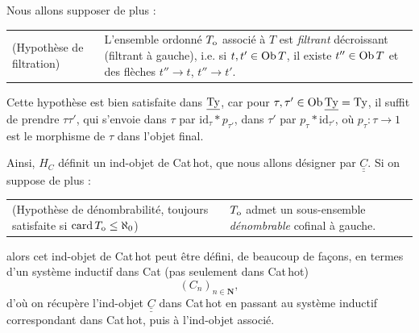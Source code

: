 Nous allons supposer de plus :

\noindent\begin{tabular}{@{}p{}p{}@{}}
(Hypothèse de filtration) & L'ensemble ordonné $T_{\mathrm{o}}$ associé à $T$ est \textit{filtrant} décroissant (filtrant à gauche), i.e. si $t,t' \in \mathrm{Ob}\, T$, il existe $t'' \in \mathrm{Ob}\, T$ et des flèches $t'' \longrightarrow t$, $t'' \longrightarrow t'$.
\end{tabular}

Cette hypothèse est bien satisfaite dans $\underline{\mathrm{Ty}}$, car pour $\tau,\tau' \in \mathrm{Ob}\, \underline{\mathrm{Ty}} = \mathrm{Ty}$, il suffit de prendre $\tau\tau'$, qui s'envoie dans $\tau$ par $\mathrm{id}_{\tau} * p_{\tau'}$, dans $\tau'$ par $p_{\tau} * \mathrm{id}_{\tau'}$, où $p_{\tau} : \tau \longrightarrow 1$ est le morphisme de $\tau$ dans l'objet final.

Ainsi, $H_{C}$ définit un ind-objet de Cat\,hot, que nous allons désigner par $\underline{\underline{C}}$. Si on suppose de plus :

\noindent\begin{tabular}{@{}p{}p{}@{}}
(Hypothèse de dénombrabilité, toujours satisfaite si $\mathrm{card}\,T_{\mathrm{o}} \leq \aleph_{0}$) & $T_{\mathrm{o}}$ admet un sous-ensemble \textit{dénombrable} cofinal à gauche.
\end{tabular}

alors cet ind-objet de Cat\,hot peut être défini, de beaucoup de façons, en termes
d'un système inductif dans Cat (pas seulement dans Cat\,hot)
\[
(C_{n})_{n\in\mathbf{N}},
\]
d'où on récupère l'ind-objet $\underline{\underline{C}}$ dans Cat\,hot en passant au système inductif correspondant dans Cat\,hot, puis à l'ind-objet associé.

